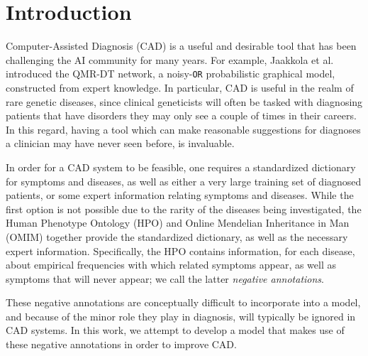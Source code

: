 \section{Introduction}
\label{sec:intro}

Computer-Assisted Diagnosis (CAD) is a useful and desirable tool that has been challenging the AI community for many years. For example, Jaakkola et al.\ \cite{qmrdt} introduced the QMR-DT network, a noisy-\texttt{OR} probabilistic graphical model, constructed from expert knowledge.
In particular, CAD is useful in the realm of rare genetic diseases, since clinical geneticists will often be tasked with diagnosing patients that have disorders they may only see a couple of times in their careers. In this regard, having a tool which can make reasonable suggestions for diagnoses a clinician may have never seen before, is invaluable.

In order for a CAD system to be feasible, one requires a standardized dictionary for symptoms and diseases, as well as either a very large training set of diagnosed patients, or some expert information relating symptoms and diseases. While the first option is not possible due to the rarity of the diseases being investigated, the Human Phenotype Ontology (HPO) \cite{kohler2014hpo} and Online Mendelian Inheritance in Man (OMIM) \cite{omim} together provide the standardized dictionary, as well as the necessary expert information. Specifically, the HPO contains information, for each disease, about empirical frequencies with which related symptoms appear, as well as symptoms that will never appear; we call the latter {\it negative annotations}.

These negative annotations are conceptually difficult to incorporate into a model, and because of the minor role they play in diagnosis, will typically be ignored in CAD systems. In this work, we attempt to develop a model that makes use of these negative annotations in order to improve CAD.